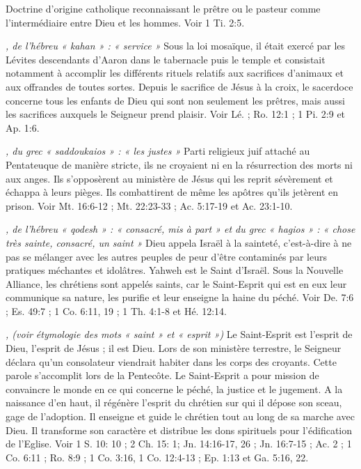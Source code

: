 \begin{multicols}{2}
\textit{}\newline
Doctrine d'origine catholique reconnaissant le prêtre ou le pasteur comme l'intermédiaire entre Dieu et les hommes. Voir 1 Ti. 2:5.

\textit{, de l'hébreu « kahan » : « service »}\newline
Sous la loi mosaïque, il était exercé par les Lévites descendants d'Aaron dans le tabernacle puis le temple et consistait notamment à accomplir les différents rituels relatifs aux sacrifices d'animaux et aux offrandes de toutes sortes. Depuis le sacrifice de Jésus à la croix, le sacerdoce concerne tous les enfants de Dieu qui sont non seulement les prêtres, mais aussi les sacrifices auxquels le Seigneur prend plaisir. Voir Lé. ; Ro. 12:1 ; 1 Pi. 2:9 et Ap. 1:6.

\textit{, du grec « saddoukaios » : « les justes »}\newline
Parti religieux juif attaché au Pentateuque de manière stricte, ils ne croyaient ni en la résurrection des morts ni aux anges. Ils s'opposèrent au ministère de Jésus qui les reprit sévèrement et échappa à leurs pièges. Ils combattirent de même les apôtres qu'ils jetèrent en prison. Voir Mt. 16:6-12 ; Mt. 22:23-33 ; Ac. 5:17-19 et Ac. 23:1-10.

\textit{, de l'hébreu « qodesh » : « consacré, mis à part » et du grec « hagios » : « chose très sainte, consacré, un saint »}\newline
Dieu appela Israël à la sainteté, c'est-à-dire à ne pas se mélanger avec les autres peuples de peur d'être contaminés par leurs pratiques méchantes et idolâtres. Yahweh est le Saint d'Israël. Sous la Nouvelle Alliance, les chrétiens sont appelés saints, car le Saint-Esprit qui est en eux leur communique sa nature, les purifie et leur enseigne la haine du péché. Voir De. 7:6 ; Es. 49:7 ; 1 Co. 6:11, 19 ; 1 Th. 4:1-8 et Hé. 12:14.

\textit{, (voir étymologie des mots « saint » et « esprit »)}\newline
Le Saint-Esprit est l'esprit de Dieu, l'esprit de Jésus ; il est Dieu. Lors de son ministère terrestre, le Seigneur déclara qu'un consolateur viendrait habiter dans les corps des croyants. Cette parole s'accomplit lors de la Pentecôte. Le Saint-Esprit a pour mission de convaincre le monde en ce qui concerne le péché, la justice et le jugement. A la naissance d'en haut, il régénère l'esprit du chrétien sur qui il dépose son sceau, gage de l'adoption. Il enseigne et guide le chrétien tout au long de sa marche avec Dieu. Il transforme son caractère et distribue les dons spirituels pour l'édification de l'Eglise. Voir 1 S. 10: 10 ; 2 Ch. 15: 1; Jn. 14:16-17, 26 ; Jn. 16:7-15 ; Ac. 2 ; 1 Co. 6:11 ; Ro. 8:9 ; 1 Co. 3:16, 1 Co. 12:4-13 ; Ep. 1:13 et Ga. 5:16, 22.


\end{multicols}
